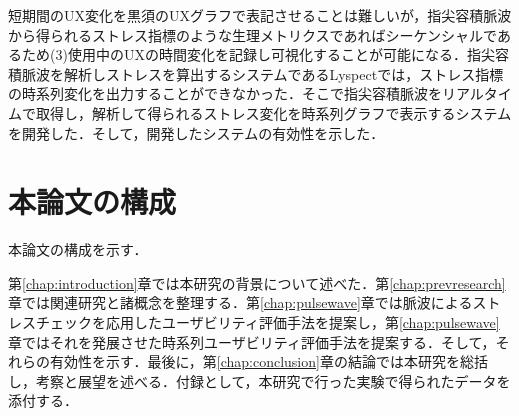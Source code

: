 短期間のUX変化を黒須のUXグラフで表記させることは難しいが，指尖容積脈波から得られるストレス指標のような生理メトリクスであればシーケンシャルであるため(3)使用中のUXの時間変化を記録し可視化することが可能になる．指尖容積脈波を解析しストレスを算出するシステムであるLyspect\cite{oyama2012}では，ストレス指標の時系列変化を出力することができなかった．そこで指尖容積脈波をリアルタイムで取得し，解析して得られるストレス変化を時系列グラフで表示するシステムを開発した．そして，開発したシステムの有効性を示した．

\section{本論文の構成}

本論文の構成を示す．

第\ref{chap:introduction}章では本研究の背景について述べた．第\ref{chap:prevresearch}章では関連研究と諸概念を整理する．第\ref{chap:pulsewave}章では脈波によるストレスチェックを応用したユーザビリティ評価手法を提案し，第\ref{chap:pulsewave}章ではそれを発展させた時系列ユーザビリティ評価手法を提案する．そして，それらの有効性を示す．最後に，第\ref{chap:conclusion}章の結論では本研究を総括し，考察と展望を述べる．付録として，本研究で行った実験で得られたデータを添付する．
